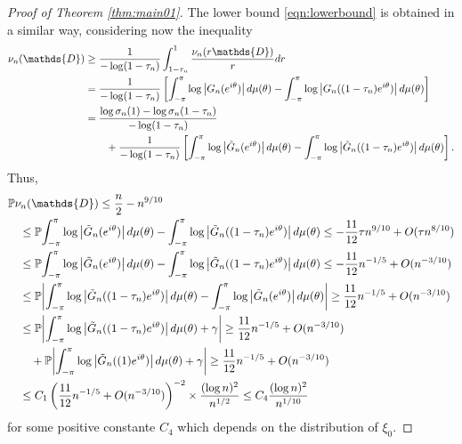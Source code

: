 \documentclass[10pt,a4paper]{amsart}
\newcommand{\CC}[1]{\left[#1\right]}
\newcommand{\PP}[1]{\left(#1\right)}
\renewcommand{\Pr}{\mathbb{P}}
\newcommand{\abs}[1]{\left|#1\right|}
\newcommand{\dd}{\textnormal{d}}
\begin{document}
\begin{proof}[Proof of Theorem \ref{thm:main01}]
The lower bound \ref{eqn:lowerbound} is obtained in a similar way, considering now the inequality
\begin{align}
\nu_n(\mathds{D}) & \geq \frac{1}{-\log(1-\tau_n)} \int_{1-\tau_n}^{1} \frac{\nu_n(r\mathds{D})}{r} \dd r \nonumber\\
& = \frac{1}{-\log(1-\tau_n)} \CC{\int_{-\pi}^{\pi} \log \abs{G_n(e^{i\theta})} \dd \mu(\theta) - \int_{-\pi}^{\pi} \log \abs{G_n((1-\tau_n)e^{i\theta})} \dd \mu(\theta)} \nonumber\\
& = \frac{\log\sigma_n(1)-\log\sigma_n(1-\tau_n)}{-\log(1-\tau_n)} \nonumber\\ 
& \quad\quad +\frac{1}{-\log(1-\tau_n)} \CC{\int_{-\pi}^{\pi} \log \abs{\tilde{G}_n(e^{i\theta})} \dd \mu(\theta) - \int_{-\pi}^{\pi} \log \abs{\tilde{G}_n((1-\tau_n)e^{i\theta})} \dd \mu(\theta)}.
\end{align}
Thus,
\begin{align*}
& \Pr{\nu_n(\mathds{D}) \leq \frac{n}{2} - n^{9/10}} \\
& \quad \leq \Pr{\int_{-\pi}^{\pi} \log \abs{\tilde{G}_n(e^{i\theta})} \dd \mu(\theta) - \int_{-\pi}^{\pi} \log \abs{\tilde{G}_n((1-\tau_n)e^{i\theta})} \dd \mu(\theta) \leq -\frac{11}{12}\tau n^{9/10}+\textnormal{O}(\tau n^{8/10}) } \\
& \quad \leq \Pr{\int_{-\pi}^{\pi} \log \abs{\tilde{G}_n(e^{i\theta})} \dd \mu(\theta) - \int_{-\pi}^{\pi} \log \abs{\tilde{G}_n((1-\tau_n)e^{i\theta})} \dd \mu(\theta) \leq  -\frac{11}{12}n^{-1/5}+\textnormal{O}(n^{-3/10}) } \\
& \quad \leq \Pr{\abs{\int_{-\pi}^{\pi} \log \abs{\tilde{G}_n((1-\tau_n)e^{i\theta})} \dd \mu(\theta) - \int_{-\pi}^{\pi} \log \abs{\tilde{G}_n(e^{i\theta})} \dd \mu(\theta) } \geq\frac{11}{12}n^{-1/5}+\textnormal{O}(n^{-3/10}) } \\
& \quad \leq \Pr{\abs{\int_{-\pi}^{\pi} \log \abs{\tilde{G}_n((1-\tau_n)e^{i\theta})} \dd \mu(\theta) + \gamma } \geq \frac{11}{12}n^{-1/5}+\textnormal{O}(n^{-3/10}) } \\
& \quad\quad +  \Pr{\abs{\int_{-\pi}^{\pi} \log \abs{\tilde{G}_n((1)e^{i\theta})} \dd \mu(\theta) + \gamma } \geq  \frac{11}{12}n^{-1/5}+\textnormal{O}(n^{-3/10}) } \\
& \quad \leq C_1 \PP{ \frac{11}{12}n^{-1/5}+\textnormal{O}(n^{-3/10}) }^{-2} \times \frac{(\log n)^2}{n^{1/2}} \leq C_4 \frac{(\log n)^2}{n^{1/10}}
\end{align*}
for some positive constante $C_4$ which depends on the distribution of $\xi_0$.


\end{proof}
\end{document}

